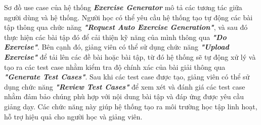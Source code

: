 \quad Sơ đồ use case của hệ thống \textbf{\textit{Exercise Generator}} mô tả các tương tác giữa người dùng và hệ thống. Người học có thể yêu cầu hệ thống tạo tự động các bài tập thông qua chức năng \textbf{\textit{"Request Auto Exercise Generation"}}, và sau đó thực hiện các bài tập đó để cải thiện kỹ năng của mình thông qua \textbf{\textit{"Do Exercise"}}. Bên cạnh đó, giảng viên có thể sử dụng chức năng \textbf{\textit{"Upload Exercise"}} để tải lên các đề bài hoặc bài tập, từ đó hệ thống sẽ tự động xử lý và tạo ra các test case nhằm kiểm tra độ chính xác của bài giải thông qua \textbf{\textit{"Generate Test Cases"}}. Sau khi các test case được tạo, giảng viên có thể sử dụng chức năng \textbf{\textit{"Review Test Cases"}} để xem xét và đánh giá các test case nhằm đảm bảo chúng phù hợp với nội dung bài tập và đáp ứng được yêu cầu giảng dạy. Các chức năng này giúp hệ thống tạo ra môi trường học tập linh hoạt, hỗ trợ hiệu quả cho người học và giảng viên.

